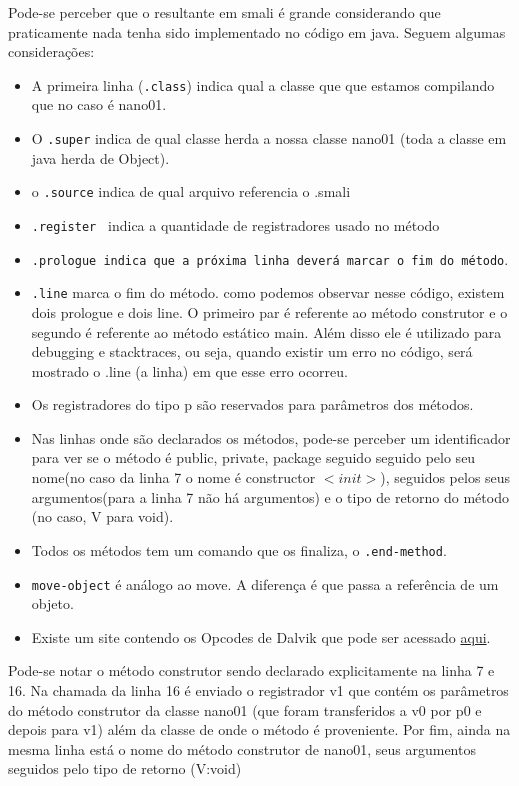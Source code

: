 \documentclass[hidelinks,12pt]{article}
\begin{document}
	Pode-se perceber que o resultante em smali é grande considerando que praticamente nada tenha sido implementado no código em java. Seguem algumas considerações:\\
	
	\begin{itemize}
		\item A primeira linha (\texttt{.class}) indica qual a classe que que estamos compilando que no caso é nano01.
		\item O \texttt{.super} indica de qual classe herda a nossa classe nano01 (toda a classe em java herda de Object).
		\item o \texttt{.source} indica de qual arquivo referencia o .smali
		\item \texttt{.register } indica a quantidade de registradores usado no método
		\item \texttt{.prologue indica que a próxima linha deverá marcar o fim do método}.
		\item \texttt{.line} marca o fim do método. como podemos observar nesse código, existem dois prologue e dois line. O primeiro par é referente ao método construtor e o segundo é referente ao método estático main. Além disso ele é utilizado para debugging e stacktraces, ou seja, quando existir um erro no código, será mostrado o .line (a linha) em que esse erro ocorreu.
		\item Os registradores do tipo p são reservados para parâmetros dos métodos.
		\item Nas linhas onde são declarados os métodos, pode-se perceber um identificador para ver se o método é public, private, package seguido seguido pelo seu nome(no caso da linha 7 o nome é constructor $<init>$), seguidos pelos seus argumentos(para a linha 7 não há argumentos) e o tipo de retorno do método (no caso, V para void).
		\item Todos os métodos tem um comando que os finaliza, o \texttt{.end-method}.
		\item \texttt{move-object} é análogo ao move. A diferença é que passa a referência de um objeto.
		\item Existe um site contendo os Opcodes de Dalvik que pode ser acessado \href{http://pallergabor.uw.hu/androidblog/dalvik_opcodes.html}{\color{blue} aqui}.
	\end{itemize}
	 
		Pode-se notar o método construtor sendo declarado explicitamente na linha 7 e 16. Na chamada da linha 16 é enviado o registrador v1 que contém os parâmetros do método construtor da classe nano01  (que foram transferidos a v0 por p0 e depois para v1) além da classe de onde o método é proveniente. Por fim, ainda na mesma linha está o nome do método construtor de nano01, seus argumentos seguidos pelo tipo de retorno (V:void)
	
\end{document}
